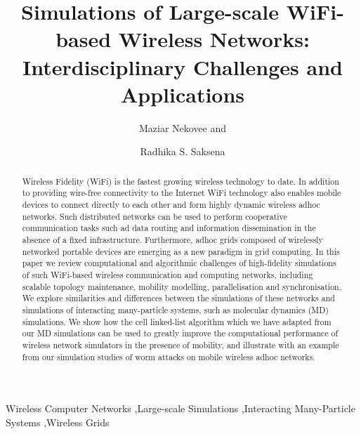 \documentclass{elsart}
\begin{document}
\begin{frontmatter}





\title{Simulations of Large-scale WiFi-based Wireless Networks:
 Interdisciplinary Challenges and Applications}

\author[label1,label2]{Maziar Nekovee and}
  \author[label2]{Radhika S. Saksena}
 \address[label1]{Mobility Research Centre, British Telecom, Polaris 134, 
Adastral Park, Martlesham, Suffolk IP5 3RE, UK }
\address[label2]{Centre for Computational Science, University College London, 20Gordon Street, London WC1H 0AJ, UK}





\begin{abstract}
Wireless Fidelity (WiFi) is the fastest growing wireless technology to date.
In addition to providing wire-free connectivity to the Internet 
WiFi technology also enables mobile devices to connect 
directly  to each other and form highly dynamic wireless adhoc networks.
Such distributed networks can be used to perform cooperative  
communication tasks such ad data routing and information dissemination in 
the absence of a fixed infrastructure. Furthermore, adhoc grids 
composed of wirelessly networked 
portable devices are emerging as a new paradigm in 
grid computing.
In this paper we review computational and algorithmic challenges of 
high-fidelity simulations of such WiFi-based wireless communication and
computing networks,
including scalable topology maintenance, mobility modelling,
parallelisation and synchronisation. We explore 
similarities and differences between  the simulations of these 
networks and simulations of interacting many-particle systems, such as 
molecular dynamics (MD) simulations.
We show how the cell linked-list algorithm which we have 
adapted  from our MD simulations can be used 
to greatly improve the computational performance of wireless network 
simulators 
in the presence of mobility, and illustrate with an example from our 
simulation studies of worm attacks on mobile wireless adhoc networks. 

\end{abstract}
\begin{keyword}
Wireless Computer Networks \sep Large-scale Simulations 
\sep Interacting Many-Particle Systems \sep Wireless Grids
\PACS 
\end{keyword}
\end{frontmatter}
\end{document}
